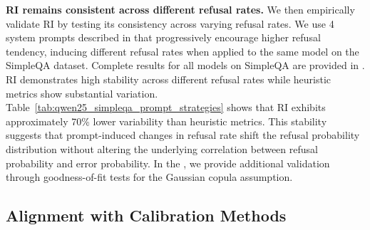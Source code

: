 \documentclass{article} %
\theoremstyle{definition}
\begin{document}

\noindent\textbf{RI remains consistent across different refusal rates.}
We then empirically validate RI by testing its consistency across varying refusal rates. 
We use 4 system prompts described in  that progressively encourage higher refusal tendency, inducing different refusal rates when applied to the same model on the SimpleQA dataset.
Complete results for all models on SimpleQA are provided in . 
RI demonstrates high stability across different refusal rates while heuristic metrics show substantial variation. 
Table~\ref{tab:qwen25_simpleqa_prompt_strategies} shows that RI exhibits approximately 70\% lower variability than heuristic metrics. 
This stability suggests that prompt-induced changes in refusal rate shift the refusal probability distribution without altering the underlying correlation between refusal probability and error probability. 
In the , we provide additional validation through goodness-of-fit tests for the Gaussian copula assumption.

\vspace{-0.5em}
\subsection{Alignment with Calibration Methods}
\vspace{-0.5em}
\end{document}
